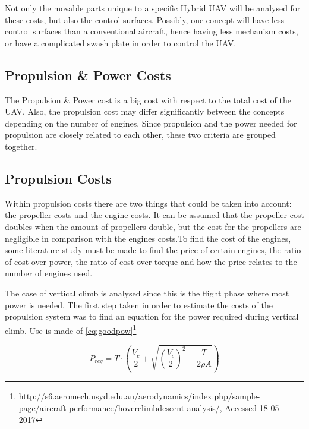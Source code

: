 Not only the movable parts unique to a specific Hybrid UAV will be analysed for these costs, but also the control surfaces. Possibly, one concept will have less control surfaces than a conventional aircraft, hence having less mechanism costs, or have a complicated swash plate in order to control the UAV.

\subsection{Propulsion \& Power Costs} 
\label{sec:powercost}

The Propulsion \& Power cost is a big cost with respect to the total cost of the UAV. Also, the propulsion cost may differ significantly between the concepts depending on the number of engines. Since propulsion and the power needed for propulsion are closely related to each other, these two criteria are grouped together. 

\subsection*{Propulsion Costs}
\label{sec:propcost}
Within propulsion costs there are two things that could be taken into account: the propeller costs and the engine costs. It can be assumed that the propeller cost doubles when the amount of propellers double, but the cost for the propellers are negligible in comparison with the engines costs.To find the cost of the engines, some literature study must be made to find the price of certain engines, the ratio of cost over power, the ratio of cost over torque and how the price relates to the number of engines used. 

The case of vertical climb is analysed since this is the flight phase where most power is needed.
The first step taken in order to estimate the costs of the propulsion system was to find an equation for the power required during vertical climb. Use is made of \autoref{eq:goodpow}\footnote{\url{http://s6.aeromech.usyd.edu.au/aerodynamics/index.php/sample-page/aircraft-performance/hoverclimbdescent-analysis/}, Accessed 18-05-2017} 


\begin{equation}\label{eq:goodpow}
    P_{req} = T \cdot \left( \frac{V_{c}}{2} + \sqrt{ \left( \frac{V_{c}}{2} \right) ^2 + \frac{T}{2 \rho A}} \right)
\end{equation}

